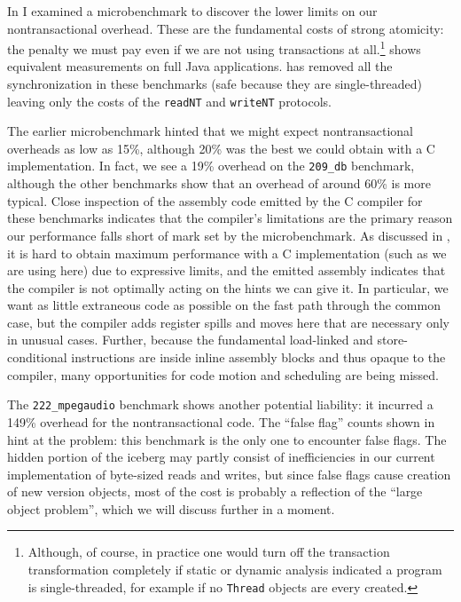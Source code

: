 
In  I examined a microbenchmark to discover the
lower limits on our nontransactional overhead.  These are the
fundamental costs of strong atomicity: the penalty we must pay even if
we are not using transactions at all.\footnote{Although, of course, in
  practice one would turn off the transaction transformation
  completely if static or dynamic analysis indicated a program is
  single-threaded, for example if no \texttt{Thread} objects are every
  created.}   shows equivalent measurements on
full Java applications.  \Flex has removed all the synchronization in
these benchmarks (safe because they are single-threaded) leaving only
the costs of the \texttt{readNT} and \texttt{writeNT} protocols.

The earlier microbenchmark hinted that we might expect
nontransactional overheads as low as 15\%, although 20\% was the best
we could obtain with a C implementation.  In fact, we see a 19\%
overhead on the \texttt{209\_db} benchmark, although the other
benchmarks show that an overhead of around 60\% is more typical.
Close inspection of the assembly code emitted by the C compiler for
these benchmarks indicates that the compiler's limitations are
the primary reason our performance falls short of mark set by the
microbenchmark.   As discussed in , it is hard to
obtain maximum performance with a C implementation (such as we are
using here) due to expressive limits, and the emitted assembly
indicates that the compiler is not optimally acting on the hints we
can give it.  In particular, we want as little extraneous code as
possible on the fast path through the common case, but the compiler
adds register spills and moves here that are necessary only in
unusual cases.  Further, because the fundamental load-linked and
store-conditional instructions are inside inline assembly blocks and
thus opaque to the compiler, many opportunities for code motion and
scheduling are being missed.

The \texttt{222\_mpegaudio} benchmark shows another potential
liability: it incurred a 149\% overhead for the nontransactional
code.  The ``false flag'' counts shown in  hint at
the problem: this benchmark is the only one to encounter false
flags.  The hidden portion of the iceberg may partly consist of
inefficiencies in our current implementation of byte-sized reads and
writes, but since false flags cause creation of new version objects,
most of the cost is probably a reflection of the ``large object
problem'', which we will discuss further in a moment.

